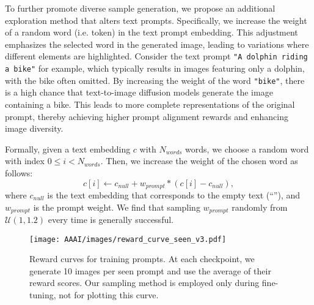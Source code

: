To further promote diverse sample generation, we propose an additional exploration method that alters text prompts.
Specifically, we increase the weight of a random word (i.e. token) in the text prompt embedding. 
This adjustment emphasizes the selected word in the generated image, leading to variations where different elements are highlighted.
Consider the text prompt \texttt{"A dolphin riding a bike"} for example, which typically results in images featuring only a dolphin, with the bike often omitted.
By increasing the weight of the word \texttt{"bike"}, there is a high chance that text-to-image diffusion models generate the image containing a bike.
This leads to more complete representations of the original prompt, thereby achieving higher prompt alignment rewards and enhancing image diversity.

Formally, given a text embedding $c$ with $N_{words}$ words, we choose a random word with index $0 \leq i < N_{words}$. Then, we increase the weight of the chosen word as follows:
\begin{equation}
c[i] \longleftarrow c_{null}+w_{prompt} *\left(c[i]-c_{null}\right),
\end{equation}
where $c_{null}$ is the text embedding that corresponds to the empty text (``''), and $w_{prompt}$ is the prompt weight. 
We find that sampling $w_{prompt}$ randomly from $\mathcal{U}(1, 1.2)$ every time is generally successful.


\begin{figure*}[t]
  \centering
  \texttt{[image: AAAI/images/reward\_curve\_seen\_v3.pdf]}
  \caption{Reward curves for training prompts. At each checkpoint, we generate 10 images per seen prompt and use the average of their reward scores. Our sampling method is employed only during fine-tuning, not for plotting this curve.}
  \label{fig:seen_curve}
\end{figure*}